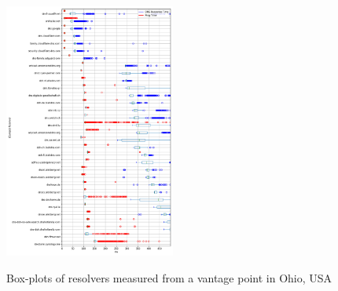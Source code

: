 \begin{figure}[t!]
{        \includegraphics[width=0.5\textwidth]{figures/Ohio_Europe.png}
    }
    \caption{Box-plots of resolvers measured from a vantage point in Ohio, USA}
\end{figure}

